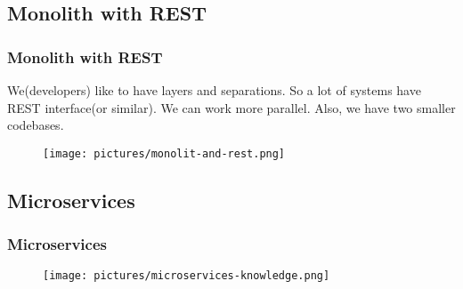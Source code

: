 \subsection{Monolith with REST}
\begin{frame}
\frametitle{Monolith with REST}
We(developers) like to have layers and separations. So a lot of systems have REST interface(or similar). We can work more parallel. Also, we have two smaller codebases.
\begin{figure}
	\centering
	\texttt{[image: pictures/monolit-and-rest.png]}		
	\label{fig:monolith-rest}
\end{figure}
\end{frame}
\subsection{Microservices}

\begin{frame}
\frametitle{Microservices}
	\begin{figure}
		\centering
		\texttt{[image: pictures/microservices-knowledge.png]}		
		\label{fig:microservices}
	\end{figure}
\end{frame}



